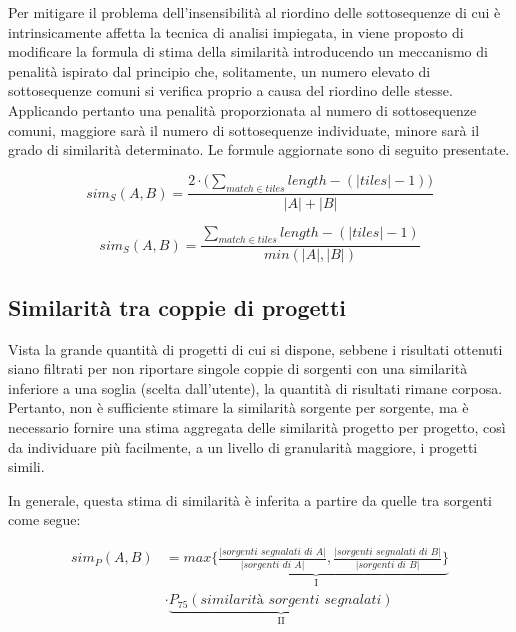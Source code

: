 Per mitigare il problema dell'insensibilità al riordino delle sottosequenze di cui è intrinsicamente affetta la tecnica di analisi impiegata, in \cite{es-plag} viene proposto di modificare la formula di stima della similarità introducendo un meccanismo di penalità ispirato dal principio che, solitamente, un numero elevato di sottosequenze comuni si verifica proprio a causa del riordino delle stesse. 
%
Applicando pertanto una penalità proporzionata al numero di sottosequenze comuni, maggiore sarà il numero di sottosequenze individuate, minore sarà il grado di similarità determinato.
%
Le formule aggiornate sono di seguito presentate.

\begin{equation}
	sim_S(A, B) = \frac{2 \cdot \bigl( \sum_{match \in tiles} length - (|tiles|-1) \bigr)}{|A|+|B|}
\end{equation}

\begin{equation}
	sim_S(A, B) = \frac{\sum_{match \in tiles} length - (|tiles|-1)}{min(|A|, |B|)}
\end{equation} 

\subsection*{Similarità tra coppie di progetti}
Vista la grande quantità di progetti di cui si dispone, sebbene i risultati ottenuti siano filtrati per non riportare singole coppie di sorgenti con una similarità inferiore a una soglia (scelta dall'utente), la quantità di risultati rimane corposa.
%
Pertanto, non è sufficiente stimare la similarità sorgente per sorgente, ma è necessario fornire una stima aggregata delle similarità progetto per progetto, così da individuare più facilmente, a un livello di granularità maggiore, i progetti simili.

In generale, questa stima di similarità è inferita a partire da quelle tra sorgenti come segue:

\begin{equation}
	\begin{split}
		sim_P(A, B) &= \underbrace{max \biggl\{ \frac{|\textit{sorgenti segnalati di A}|}{|\textit{sorgenti di A}|}, \frac{|\textit{sorgenti segnalati di B}|}{|\textit{sorgenti di B}|} \biggr\}}_\text{I} \\
		&  \cdot \underbrace{P_{75}(\textit{similarità sorgenti segnalati})}_\text{II}
	\end{split}
	\label{eq:project-similarity}
\end{equation}


